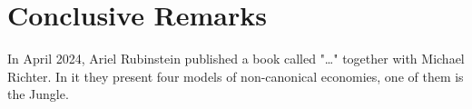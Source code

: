 \documentclass[12pt,a4paper]{article}
\numberwithin{theorem}{section}
\numberwithin{definition}{section}
\numberwithin{example}{section}
\numberwithin{exercise}{section}
\begin{document}

\newpage



\newpage



\newpage



\newpage

\section{Conclusive Remarks}

In April 2024, Ariel Rubinstein published a book called "\dots" together with Michael Richter. In it they present four models of non-canonical economies, one of them is the Jungle. 

\newpage

\nocite{*}
\printbibliography[]

\newpage


\end{document}
